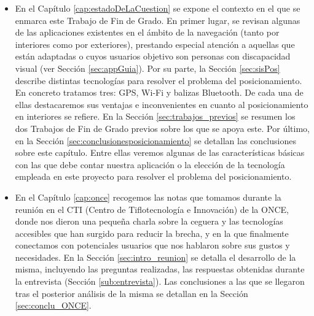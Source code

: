\begin{itemize}
	\item En el Capítulo \ref{cap:estadoDeLaCuestion} se expone el contexto en el que se enmarca este Trabajo de Fin de Grado. En primer lugar, se revisan algunas de las aplicaciones existentes en el ámbito de la navegación (tanto por interiores como por exteriores), prestando especial atención a aquellas que están adaptadas o cuyos usuarios objetivo son personas con discapacidad visual (ver Sección \ref{sec:appGuia}). Por su parte, la Sección \ref{sec:sisPos} describe distintas tecnologías para resolver el problema del posicionamiento. En concreto tratamos tres: GPS, Wi-Fi y balizas Bluetooth. De cada una de ellas destacaremos sus ventajas e inconvenientes en cuanto al posicionamiento en interiores se refiere. En la Sección \ref{sec:trabajos_previos} se resumen los dos Trabajos de Fin de Grado previos sobre los que se apoya este. Por último, en la Sección \ref{sec:conclusionesposicionamiento} se detallan las conclusiones sobre este capítulo. Entre ellas veremos algunas de las características básicas con las que debe contar nuestra aplicación o la elección de la tecnología empleada en este proyecto para resolver el problema del posicionamiento. 

	\item En el Capítulo \ref{cap:once} recogemos las notas que tomamos durante la reunión en el CTI (Centro de Tiflotecnología e Innovación) de la ONCE, donde nos dieron una pequeña charla sobre la ceguera y las tecnologías accesibles que han surgido para reducir la brecha, y en la que finalmente conectamos con potenciales usuarios que nos hablaron sobre sus gustos y necesidades. En la Sección \ref{sec:intro_reunion} se detalla el desarrollo de la misma, incluyendo las preguntas realizadas, las respuestas obtenidas durante la entrevista (Sección \ref{sub:entrevista}). Las conclusiones a las que se llegaron tras el posterior análisis de la misma se detallan en la Sección \ref{sec:conclu_ONCE}. 


\end{itemize}
